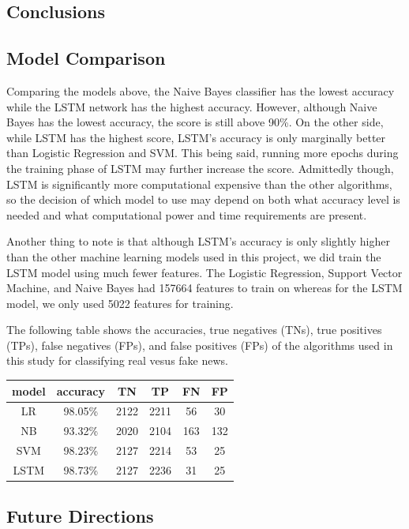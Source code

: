 \documentclass{article}
\begin{document}
\begin{multicols}{2}
\section{Conclusions}

\subsection{Model Comparison}


Comparing the models above, the Naive Bayes classifier has the lowest accuracy while the LSTM network has the highest accuracy. However, although Naive Bayes has the lowest accuracy, the score is still above 90\%. On the other side, while LSTM has the highest score, LSTM's accuracy is only marginally better than Logistic Regression and SVM. This being said, running more epochs during the training phase of LSTM may further increase the score. Admittedly though, LSTM is significantly more computational expensive than the other algorithms, so the decision of which model to use may depend on both what accuracy level is needed and what computational power and time requirements are present. 

Another thing to note is that although LSTM's accuracy is only slightly higher than the other machine learning models used in this project, we did train the LSTM model using much fewer features. The Logistic Regression, Support Vector Machine, and Naive Bayes had 157664 features to train on whereas for the LSTM model, we only used 5022 features for training.

The following table shows the accuracies, true negatives (TNs), true positives (TPs), false negatives (FPs), and false positives (FPs) of the algorithms used in this study for classifying real vesus fake news. 


\begin{center}
\begin{tabular}{ c| c c c c c}
 model & accuracy & TN & TP & FN & FP \\ 
\hline
LR & 98.05\% & 2122  & 2211 & 56 & 30\\ 
NB & 93.32\% & 2020 & 2104 & 163 & 132\\
SVM & 98.23\% & 2127 & 2214 & 53 & 25\\
LSTM & 98.73\% & 2127 & 2236 & 31 & 25 \\
\end{tabular}
\end{center}

\subsection{Future Directions}


\end{multicols}
\end{document}
